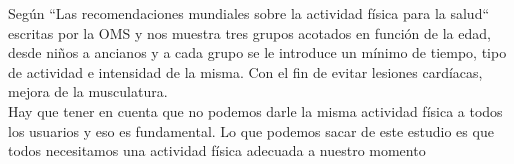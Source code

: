 \documentclass[a4paper, 11pt]{article}
\begin{document}
      Según ``Las recomendaciones mundiales sobre la actividad física para la
      salud`` escritas por la OMS y nos muestra tres grupos acotados en función
      de la edad, desde niños a ancianos y a cada grupo se le introduce un
      mínimo de tiempo, tipo de actividad e intensidad de la misma. Con el fin
      de evitar lesiones cardíacas, mejora de la musculatura.\\

      Hay que tener en cuenta que no podemos darle la misma actividad física a
      todos los usuarios y eso es fundamental. Lo que podemos sacar de este
      estudio es que todos necesitamos una actividad física adecuada a nuestro
      momento\\

\end{document}
